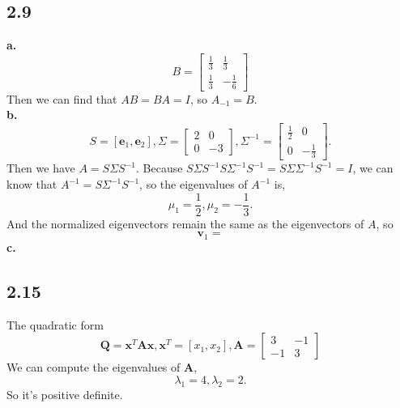 \message{ !name(hw1.tex)}\documentclass{article}
\begin{document}
\subsection*{2.9}
\textbf{a.}\\
\begin{equation*}
  B = \left[
    \begin{matrix}
      \frac{1}{3}&\frac{1}{3}\\
      \frac{1}{3}&-\frac{1}{6}
    \end{matrix}\right]
\end{equation*}
Then we can find that $AB = BA = I$, so $A_{-1} = B$.\\
\textbf{b.}\\
\begin{equation*}
  S = \left[\mathbf{e}_1, \mathbf{e}_2\right], \Sigma = \left[
    \begin{matrix}
      2&0\\
      0&-3
    \end{matrix}\right], \Sigma^{-1} = \left[
    \begin{matrix}
      \frac{1}{2}&0\\
      0&-\frac{1}{3}
    \end{matrix}\right].
\end{equation*}
Then we have $A = S\Sigma S^{-1}$.
Because $S\Sigma S^{-1} S\Sigma^{-1}S^{-1} = S\Sigma\Sigma^{-1}S^{-1} = I$,
we can know that $A^{-1} = S\Sigma^{-1}S^{-1}$, so the eigenvalues of $A^{-1}$ is,
\begin{equation*}
  \mu_1 = \frac{1}{2}, \mu_2 = -\frac{1}{3}.
\end{equation*}
And the normalized eigenvectors remain the same as the eigenvectors of $A$, so
\begin{equation*}
  \mathbf{v}_1 = 
\end{equation*}
\textbf{c.}\\

\subsection*{2.15}
The quadratic form
\begin{equation*}
  \mathbf{Q} = \mathbf{x}^T\mathbf{Ax}, \mathbf{x}^T = \left[x_1, x_2\right], \mathbf{A} = \left[
        \begin{matrix}
          3&-1\\
          -1&3
        \end{matrix}\right]
\end{equation*}
We can compute the eigenvalues of $\mathbf{A}$,
\begin{equation*}
  \lambda_1 = 4, \lambda_2 = 2.
\end{equation*}
So it's positive definite.
\end{document}

